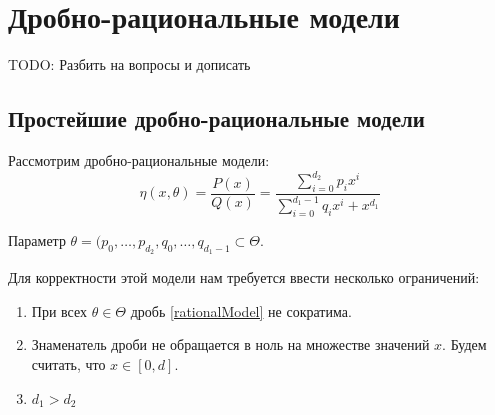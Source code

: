 \section{Дробно-рациональные модели}

{\color{blue} TODO: Разбить на вопросы и дописать}
\subsection{Простейшие дробно-рациональные модели}
Рассмотрим дробно-рациональные модели:
\begin{equation}
\label{rationalModel}
\eta(x, \theta) = \frac{P(x)}{Q(x)} = \frac{\sum\limits_{i=0}^{d_2}p_ix^i}{\sum\limits_{i=0}^{d_1-1}q_ix^i + x^{d_1}}
\end{equation}

Параметр $\theta = (p_0, …, p_{d_2}, q_0, …, q_{d_1-1}\subset \Theta$.

Для корректности этой модели нам требуется ввести несколько ограничений:
\begin{enumerate}
\item При всех $\theta \in \Theta$ дробь \eqref{rationalModel} не сократима. 
\item Знаменатель дроби не обращается в ноль на множестве значений $x$. Будем считать, что $x \in [0,d]$. 
\item $d_1 > d_2$
\end{enumerate}


